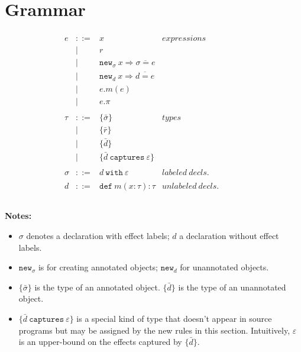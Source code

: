 \documentclass{llncs}
\newcommand{\keywadj}[1]{\mathtt{#1}}
\newcommand{\keyw}[1]{\keywadj{#1}~}
\begin{document}
\section{Grammar}

\[
\begin{array}{lll}

\begin{array}{lllr}

e & ::= & x & expressions \\
  		& | & r \\
		& | & \keywadj{new}_\sigma~x \Rightarrow \overline{\sigma = e} \\
 		& | & \keywadj{new}_d~x \Rightarrow \overline{d = e} \\
 		& | & e.m(e)\\
 		& | & e.\pi\\
		&&\\

\tau & ::= & \{ \bar \sigma \} & types \\
		& | & \{ \bar r \} \\
		& | & \{ \bar d \} \\
		& | & \{ \bar d ~\keyw{captures} \varepsilon \} \\
		&&\\
		
\sigma & ::= & d~\keyw{with}\varepsilon  & labeled~ decls.\\
		&&\\

d & ::= & \keyw{def} m(x:\tau):\tau & unlabeled~decls.\\
		&&\\

\end{array}
& ~~~~~~
&
\end{array}
\]

\noindent \textbf{Notes:}
\begin{itemize}
	\item $\sigma$ denotes a declaration with effect labels; $d$ a declaration without effect labels.
	\item $\keywadj{new}_\sigma$ is for creating annotated objects; $\keywadj{new}_d$ for unannotated objects.
	\item $\{ \bar \sigma \}$ is the type of an annotated object. $\{ \bar d \}$ is the type of an unannotated object.
	\item $\{ \bar d ~\keyw{captures} \varepsilon \}$ is a special kind of type that doesn't appear in source programs but may be assigned by the new rules in this section. Intuitively, $\varepsilon$ is an upper-bound on the effects captured by $\{ \bar d \}$.
\end{itemize}
\end{document}
